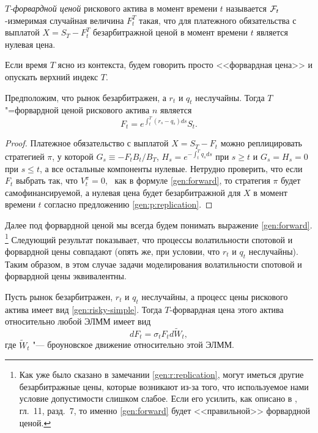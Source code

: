 \begin{definition}
\emph{$T$-форвардной ценой} рискового актива в момент времени $t$ называется $\mathcal{F}_t$-измеримая случайная величина $F_t^T$ такая, что для платежного обязательства с выплатой $X=S_T-F_t^T$ безарбитражной ценой в момент времени $t$ является нулевая цена.
\end{definition}

Если время $T$ ясно из контекста, будем говорить просто <<форвардная цена>> и опускать верхний индекс $T$.

\begin{proposition}
Предположим, что рынок безарбитражен, а $r_t$ и $q_t$ неслучайны.
Тогда $T$"=форвардной ценой рискового актива $n$ является
\begin{equation}
\label{gen:forward}
F_t =  e^{\int_t^T (r_s - q_s) ds} S_t.
\end{equation}
\end{proposition}

\begin{proof}
Платежное обязательство с выплатой $X=S_T - F_t$ можно реплицировать стратегией $\pi$, у которой $G_s \equiv -F_tB_t/B_T$, $H_s = e^{-\int_t^T q_s ds}$ при $s\ge t$ и $G_s=H_s=0$ при $s\le t$, а все остальные компоненты нулевые.
Нетрудно проверить, что если $F_t$ выбрать так, что $V_t^\pi = 0$, \te\ как в формуле \eqref{gen:forward}, то стратегия $\pi$ будет самофинансируемой, а нулевая цена будет безарбитражной для $X$ в момент времени $t$ согласно предложению \ref{gen:p:replication}.
\end{proof}

Далее под форвардной ценой мы всегда будем понимать выражение \eqref{gen:forward}.%
\footnote{Как уже было сказано в замечании \ref{gen:r:replication}, могут иметься другие безарбитражные цены, которые возникают из-за того, что используемое нами условие допустимости слишком слабое.
Если его усилить, как описано в \cite{EberleinKallsen19}, гл.~11, разд.~7, то именно \eqref{gen:forward} будет <<правильной>> форвардной ценой.}
Следующий результат показывает, что процессы волатильности спотовой и форвардной цены совпадают (опять же, при условии, что $r_t$ и $q_t$ неслучайны).
Таким образом, в этом случае задачи моделирования волатильности спотовой и форвардной цены эквивалентны.

\begin{proposition}
\label{gen:c:forward-vol}
Пусть рынок безарбитражен, $r_t$ и $q_t$ неслучайны, а процесс цены рискового актива имеет вид \eqref{gen:risky-simple}.
Тогда $T$-форвардная цена этого актива относительно любой ЭЛММ имеет вид
\begin{equation}
\label{gen:forward-price}
d F_t = \sigma_t F_t d \tilde W_t,
\end{equation}
где $\tilde W_t$ "--- броуновское движение относительно этой ЭЛММ.
\end{proposition}

